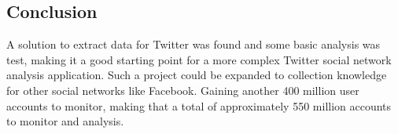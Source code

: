 \documentclass[]{article}  %
\begin{document}
\subsection{Conclusion}

A solution to extract data for Twitter was found and some basic analysis was test, making it a good starting point for a more complex Twitter social network analysis application. Such a project could be expanded to collection knowledge for other social networks like Facebook. Gaining another 400 million user accounts to monitor, making that a total of approximately 550 million accounts to monitor and analysis.

\nocite{bib1} 
\nocite{bib2}
\nocite{bib3}
\nocite{bib4}
\nocite{bib5}
\nocite{bib6}
\nocite{bib7}
\nocite{bib8}
\nocite{bib9}
\nocite{bib10}
\nocite{bib11}
\nocite{bib12}
\nocite{bib13}




\end{document}
